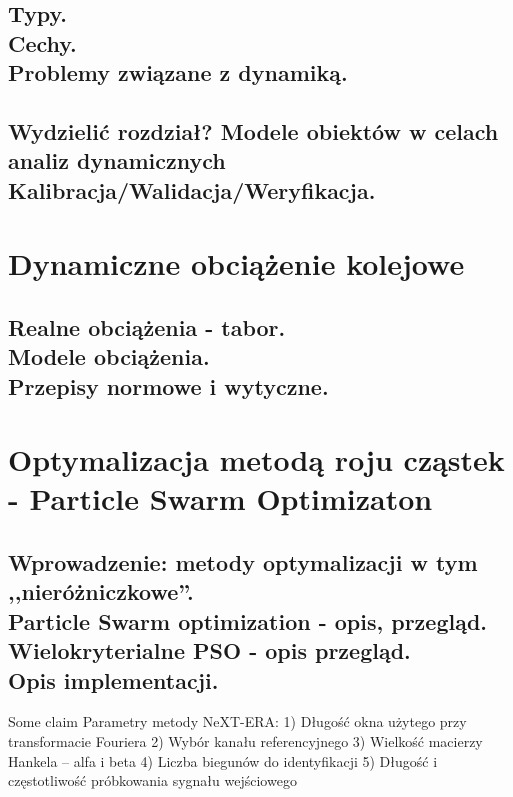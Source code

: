 	\section{Typy.\\Cechy.\\Problemy związane z dynamiką.}
	\section{\textbf{Wydzielić rozdział?} Modele obiektów w celach analiz dynamicznych\\Kalibracja/Walidacja/Weryfikacja.}
\chapter{Dynamiczne obciążenie kolejowe}
	\section{Realne obciążenia - tabor.\\Modele obciążenia.\\Przepisy normowe i wytyczne.}
	
	
	
	



\chapter{Optymalizacja metodą roju cząstek - Particle Swarm Optimizaton}
	\section{Wprowadzenie: metody optymalizacji w tym ,,nieróżniczkowe''.\\Particle Swarm optimization - opis, przegląd.\\Wielokryterialne PSO - opis przegląd.\\Opis implementacji.}
	
	
	
	











Some claim \parencite{szafranski_oddzialywania_2013,rucka_dynamika_2014}
Parametry metody NeXT-ERA: \parencite{caicedo_practical_2011}
1)	Długość okna użytego przy transformacie Fouriera
2)	Wybór kanału referencyjnego
3)	Wielkość macierzy Hankela – alfa i beta
4)	Liczba biegunów do identyfikacji
5)	Długość i częstotliwość próbkowania sygnału wejściowego

